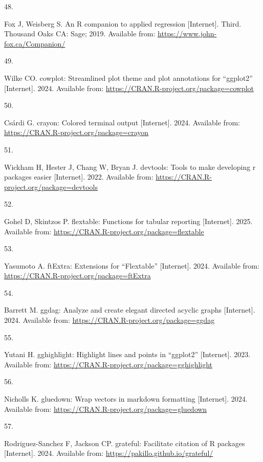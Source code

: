 \documentclass[
]{article}
\newlength{\cslhangindent}
\newlength{\csllabelwidth}
\newenvironment{CSLReferences}[2] %
 {\begin{list}{}{%
  \setlength{\itemindent}{0pt}
  \setlength{\leftmargin}{0pt}
  \setlength{\parsep}{0pt}
  \ifodd #1
   \setlength{\leftmargin}{\cslhangindent}
   \setlength{\itemindent}{-1\cslhangindent}
  \fi
  \setlength{\itemsep}{#2\baselineskip}}}
 {\end{list}}
\newcommand{\CSLLeftMargin}[1]{\parbox[t]{\csllabelwidth}{\strut#1\strut}}
\newcommand{\CSLRightInline}[1]{\parbox[t]{\linewidth - \csllabelwidth}{\strut#1\strut}}
\begin{document}
\begin{CSLReferences}{0}{1}
\CSLLeftMargin{48. }%
\CSLRightInline{Fox J, Weisberg S. An {R} companion to applied regression {[}Internet{]}. Third. Thousand Oaks {CA}: Sage; 2019. Available from: \url{https://www.john-fox.ca/Companion/}}

\CSLLeftMargin{49. }%
\CSLRightInline{Wilke CO. {cowplot}: Streamlined plot theme and plot annotations for {``{ggplot2}''} {[}Internet{]}. 2024. Available from: \url{https://CRAN.R-project.org/package=cowplot}}

\CSLLeftMargin{50. }%
\CSLRightInline{Csárdi G. {crayon}: Colored terminal output {[}Internet{]}. 2024. Available from: \url{https://CRAN.R-project.org/package=crayon}}

\CSLLeftMargin{51. }%
\CSLRightInline{Wickham H, Hester J, Chang W, Bryan J. {devtools}: Tools to make developing r packages easier {[}Internet{]}. 2022. Available from: \url{https://CRAN.R-project.org/package=devtools}}

\CSLLeftMargin{52. }%
\CSLRightInline{Gohel D, Skintzos P. {flextable}: Functions for tabular reporting {[}Internet{]}. 2025. Available from: \url{https://CRAN.R-project.org/package=flextable}}

\CSLLeftMargin{53. }%
\CSLRightInline{Yasumoto A. {ftExtra}: Extensions for {``{Flextable}''} {[}Internet{]}. 2024. Available from: \url{https://CRAN.R-project.org/package=ftExtra}}

\CSLLeftMargin{54. }%
\CSLRightInline{Barrett M. {ggdag}: Analyze and create elegant directed acyclic graphs {[}Internet{]}. 2024. Available from: \url{https://CRAN.R-project.org/package=ggdag}}

\CSLLeftMargin{55. }%
\CSLRightInline{Yutani H. {gghighlight}: Highlight lines and points in {``{ggplot2}''} {[}Internet{]}. 2023. Available from: \url{https://CRAN.R-project.org/package=gghighlight}}

\CSLLeftMargin{56. }%
\CSLRightInline{Nicholls K. {gluedown}: Wrap vectors in markdown formatting {[}Internet{]}. 2024. Available from: \url{https://CRAN.R-project.org/package=gluedown}}

\CSLLeftMargin{57. }%
\CSLRightInline{Rodriguez-Sanchez F, Jackson CP. {grateful}: Facilitate citation of {R} packages {[}Internet{]}. 2024. Available from: \url{https://pakillo.github.io/grateful/}}


\end{CSLReferences}
\end{document}
